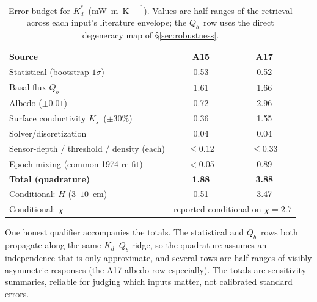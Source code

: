 \documentclass[11pt,a4paper,oneside]{report}
\newcommand{\Kd}{\ensuremath{K_d}}
\newcommand{\Kds}{\ensuremath{K_d^{*}}}
\newcommand{\Ks}{\ensuremath{K_s}}
\newcommand{\Qb}{\ensuremath{Q_b}}
\newcommand{\mWmK}{\si{\milli\watt\per\meter\per\kelvin}}
\begin{document}
\begin{table}[htbp]
  \centering\small
  \caption{Error budget for \Kds\ (\mWmK). Values are
  half-ranges of the retrieval across each input's literature
  envelope; the \Qb\ row uses the direct degeneracy map of
  \S\ref{sec:robustness}.}
  \label{tab:budget}
  \begin{tabular}{lcc}
    \toprule
    Source & A15 & A17 \\
    \midrule
    Statistical (bootstrap $1\sigma$) & 0.53 & 0.52 \\
    Basal flux \Qb                    & 1.61 & 1.66 \\
    Albedo ($\pm0.01$)                & 0.72 & 2.96 \\
    Surface conductivity \Ks\ ($\pm30\%$) & 0.36 & 1.55 \\
    Solver/discretization             & 0.04 & 0.04 \\
    Sensor-depth / threshold / density (each) & $\le$0.12 & $\le$0.33 \\
    Epoch mixing (common-1974 re-fit) & $<$0.05 & 0.89 \\
    \midrule
    \textbf{Total (quadrature)}       & \textbf{1.88} & \textbf{3.88} \\
    \midrule
    Conditional: $H$ ($3$--$10$~cm)   & 0.51 & 3.47 \\
    Conditional: $\chi$               & \multicolumn{2}{c}{reported conditional on $\chi=2.7$} \\
    \bottomrule
  \end{tabular}
\end{table}

One honest qualifier accompanies the totals. The statistical and \Qb\
rows both propagate along the same $\Kd$--$\Qb$ ridge, so the
quadrature assumes an independence that is only approximate, and
several rows are half-ranges of visibly asymmetric responses (the A17
albedo row especially). The totals are sensitivity summaries,
reliable for judging which inputs matter, not calibrated standard
errors.
\end{document}
